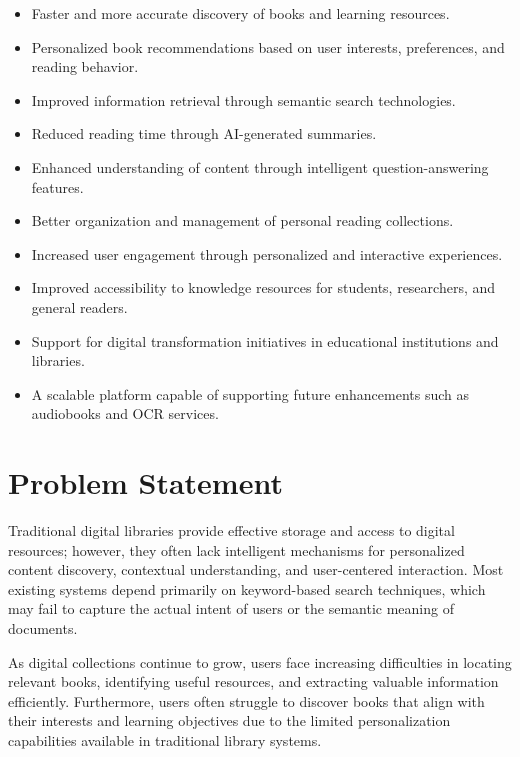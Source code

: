 \begin{itemize}
  \item Faster and more accurate discovery of books and learning resources.
  \item Personalized book recommendations based on user interests, preferences,
        and reading behavior.
  \item Improved information retrieval through semantic search technologies.
  \item Reduced reading time through AI-generated summaries.
  \item Enhanced understanding of content through intelligent
        question-answering features.
  \item Better organization and management of personal reading collections.
  \item Increased user engagement through personalized and interactive
        experiences.
  \item Improved accessibility to knowledge resources for students,
        researchers, and general readers.
  \item Support for digital transformation initiatives in educational
        institutions and libraries.
  \item A scalable platform capable of supporting future enhancements such as
        audiobooks and OCR services.
\end{itemize}

\section{Problem Statement}
\label{sec:problem}

Traditional digital libraries provide effective storage and access to digital
resources; however, they often lack intelligent mechanisms for personalized
content discovery, contextual understanding, and user-centered interaction.
Most existing systems depend primarily on keyword-based search techniques,
which may fail to capture the actual intent of users or the semantic meaning
of documents.

As digital collections continue to grow, users face increasing difficulties
in locating relevant books, identifying useful resources, and extracting
valuable information efficiently. Furthermore, users often struggle to
discover books that align with their interests and learning objectives due to
the limited personalization capabilities available in traditional library
systems.

